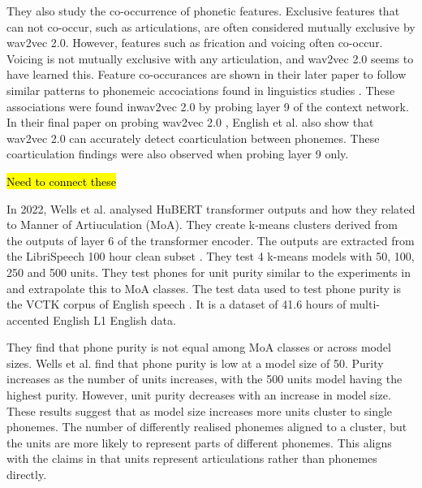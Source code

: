 They also study the co-occurrence of phonetic features. Exclusive features that can not co-occur, such as articulations, are often considered mutually exclusive by wav2vec 2.0. However, features such as frication and voicing often co-occur. Voicing is not mutually exclusive with any articulation, and wav2vec 2.0 seems to have learned this. Feature co-occurances are shown in their later paper \cite{english2024searching} to follow similar patterns to phonemeic accociations found in linguistics studies \cite{sagey1986representation}. These associations were found inwav2vec 2.0 by probing layer 9 of the context network. In their final paper on probing wav2vec 2.0 \cite{wav2vec}, English et al. \cite{english2024following} also show that wav2vec 2.0 can accurately detect coarticulation between phonemes. These coarticulation findings were also observed when probing layer 9 only.

\hl{Need to connect these}

In 2022, Wells et al. \cite{wells2022phonetic} analysed HuBERT transformer outputs and how they related to Manner of Artiuculation (MoA). They create k-means clusters derived from the outputs of layer 6 of the transformer encoder. The outputs are extracted from the LibriSpeech 100 hour clean subset \cite{librilight}. They test 4 k-means models with 50, 100, 250 and 500 units. They test phones for unit purity similar to the experiments in \cite{hsu2021hubert} and extrapolate this to MoA classes. The test data used to test phone purity is the  VCTK corpus of English speech \cite{citation_needed}. It is a dataset of 41.6 hours of multi-accented English L1 English data.

They find that phone purity is not equal among MoA classes or across model sizes. Wells et al. \cite{wells2022phonetic} find that phone purity is low at a model size of 50. Purity increases as the number of units increases, with the 500 units model having the highest purity. However, unit purity decreases with an increase in model size. These results suggest that as model size increases more units cluster to single phonemes. The number of differently realised phonemes aligned to a cluster, but the units are more likely to represent parts of different phonemes. This aligns with the claims in \cite{hsu2021hubert} that units represent articulations rather than phonemes directly. 

